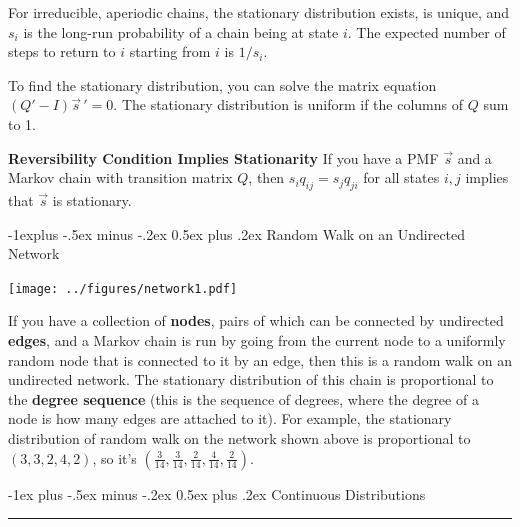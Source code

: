 \documentclass[10pt,landscape]{article}
\makeatletter
\renewcommand{\section}{\@startsection{section}{1}{0mm}%
                                {-1ex plus -.5ex minus -.2ex}%
                                {0.5ex plus .2ex}%
                                {\normalfont\large\bfseries}}
\renewcommand{\subsection}{\@startsection{subsection}{2}{0mm}%
                                {-1explus -.5ex minus -.2ex}%
                                {0.5ex plus .2ex}%
                                {\normalfont\normalsize\bfseries}}
\makeatother
\begin{document}
\begin{multicols*}{3}
    \smallskip
                                    
    For irreducible, aperiodic chains, the stationary distribution exists, is unique, and $s_i$ is the long-run probability of a chain being at state $i$. The expected number of steps to return to $i$ starting from $i$ is $1/s_i$.
                                    
    \smallskip
                                    
    To find the stationary distribution, you can solve the matrix equation $(Q' - I){\vec{s}\,}'= 0$. The stationary distribution is uniform if the columns of $Q$ sum to 1.
                                    
    \smallskip
                                    
    \textbf{Reversibility Condition Implies Stationarity}  If you have a PMF $\vec{s}$ and a Markov chain with transition matrix $Q$, then $s_iq_{ij} = s_jq_{ji}$ for all states $i, j$ implies that $\vec{s}$ is stationary.
                                    
    \subsection{Random Walk on an Undirected Network}
    \begin{minipage}{\linewidth}
        \centering
        \texttt{[image: ../figures/network1.pdf]}
    \end{minipage}
    \medskip
                                    
    If you have a collection of \textbf{nodes}, pairs of which can be connected by undirected \textbf{edges}, and a Markov chain is run by going from the current node to a uniformly random node that is connected to it by an edge, then  this is a random walk on an undirected network. The stationary distribution of this chain is proportional to the \textbf{degree sequence} (this is the sequence of degrees, where the degree of a node is how many edges are attached to it). For example, the stationary distribution of random walk on the network shown above is proportional to $(3,3,2,4,2)$, so it's $(\frac{3}{14}, \frac{3}{14}, \frac{2}{14}, \frac{4}{14}, \frac{2}{14})$. 
                                    
    \section{Continuous Distributions}\smallskip \hrule height 2pt \smallskip
                                    

\end{multicols*}
\end{document}
